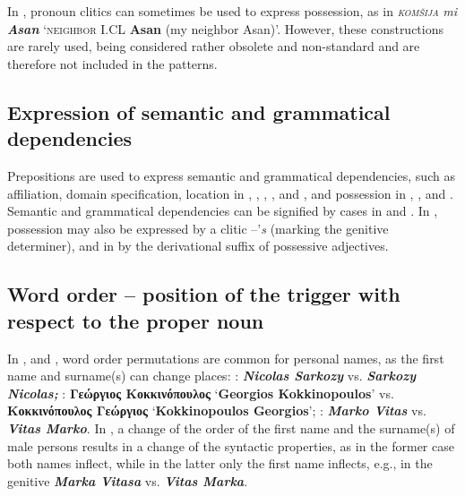 \documentclass[output=paper]{langsci/langscibook}
\newcommand{\trigger}[1]{\textsc{#1}}
\begin{document}
In , pronoun clitics can sometimes be used to express possession,
as in \textit{\trigger{komšija}} \textit{mi }\textbf{\textit{Asan}}
‘\trigger{neighbor} I.CL \textbf{Asan }(my neighbor Asan)’. However,
these constructions are rarely used, being considered rather obsolete
and non-standard and are therefore not included in the patterns.


\subsection{Expression of semantic and grammatical dependencies} %

Prepositions are used to express semantic and grammatical dependencies,
such as affiliation, domain specification, location in ,
, , , and , and possession in ,
, and . Semantic and grammatical dependencies can be
signified by cases in  and . In , possession may
also be expressed by a clitic –’\textit{s }(marking the genitive
determiner), and in  by the derivational suffix of possessive
adjectives.


\subsection{Word order – position of the trigger with respect to the proper noun} %


In ,  and , word order permutations are common for
personal names, as the first name and surname(s) can change places: :
\textbf{\textit{Nicolas Sarkozy}} vs. \textbf{\textit{Sarkozy
Nicolas;}} : \textbf{Γεώργιος Κοκκινόπουλος}
‘\textbf{Georgios Kokkinopoulos}’ vs. \textbf{Κοκκινόπουλος
Γεώργιος} ‘\textbf{Kokkinopoulos Georgios}’; : \textbf{\textit{Marko
Vitas}} vs. \textbf{\textit{Vitas Marko}}. In , a change of the
order of the first name and the surname(s) of male persons results in a
change of the syntactic properties, as in the former case both names
inflect, while in the latter only the first name inflects, e.g., in the
genitive \textbf{\textit{Marka Vitasa}} vs. \textbf{\textit{Vitas
Marka}}.
\end{document}
